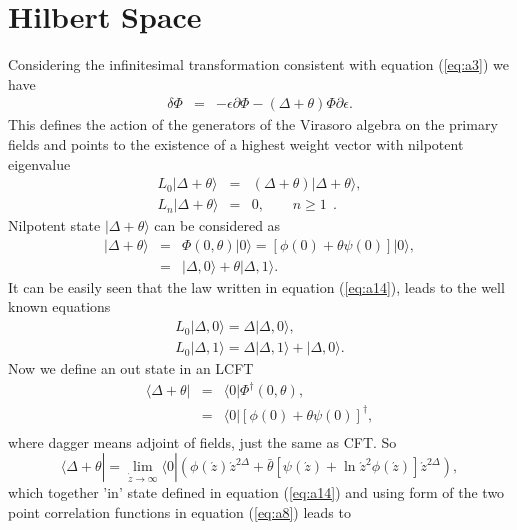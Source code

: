 \documentclass[a4paper,11pt]{article}
\begin{document}
\section{Hilbert Space}
Considering the infinitesimal transformation consistent with
equation (\ref{eq:a3}) we have
\begin{eqnarray}\label{eq:a12}
\delta\Phi&=&-\epsilon\partial\Phi-(\Delta+\theta)\Phi\partial\epsilon.
\end{eqnarray}
This defines the action of the generators of the Virasoro algebra
on the primary fields and points to the existence of a highest
weight vector with nilpotent eigenvalue
\begin{eqnarray}\label{eq:a13}
L_{0}|\Delta+\theta\rangle&=&(\Delta+\theta)|\Delta+\theta\rangle ,\nonumber\\
L_{n}|\Delta+\theta\rangle&=&0,\:\:\:\:\:\:\:\:\:n\geq1\:\:.
\end{eqnarray}
Nilpotent state $|\Delta+\theta\rangle$ can be considered as
\begin{eqnarray}\label{eq:a14}
|\Delta+\theta\rangle&=&\Phi(0,\theta)|0\rangle=[\phi(0)+\theta\psi(0)]|0\rangle,\nonumber\\
&=&|\Delta,0\rangle+ \theta |\Delta,1 \rangle .
\end{eqnarray}
It can be easily seen that the law written in equation
(\ref{eq:a14}), leads to the well known equations
\begin{eqnarray}\label{eq:a15}
L_{0}|\Delta,0\rangle=\Delta|\Delta,0\rangle ,\nonumber\\
L_{0}|\Delta,1\rangle=\Delta|\Delta,1\rangle+|\Delta,0\rangle.
\end{eqnarray}
Now we define an out state in an LCFT
\begin{eqnarray}\label{eq:a16}
\langle \Delta+\theta|&=&\langle 0|\Phi^{\dag}(0,\theta),\nonumber\\
&=&\langle 0|[\phi(0)+\theta\psi(0)] ^{\dag},\nonumber\\
\end{eqnarray}
where dagger means adjoint of fields, just the same as CFT. So
\begin{equation}\label{eq:a17}
\langle \Delta+\theta|=\lim_{\acute{z}\rightarrow \infty}\langle
0|\left({\phi(\acute{z})
\acute{z}^{2\Delta}+\bar{\theta}[\psi(\acute{z})+\ln\acute{z}^2\phi(\acute{z})]}\acute{z}^{2\Delta}\right),
\end{equation}
which together 'in' state defined in equation (\ref{eq:a14}) and
using form of the two point correlation functions in equation
(\ref{eq:a8}) leads to
\end{document}
